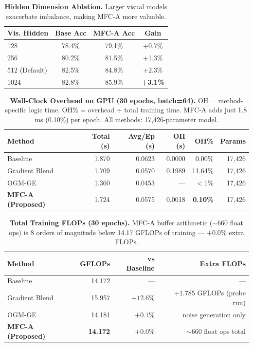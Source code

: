 \documentclass[fleqn,10pt]{wlscirep}
\begin{document}
\begin{table}[h]
\caption{\textbf{Hidden Dimension Ablation.} Larger visual models exacerbate imbalance, making MFC-A more valuable.}
\label{tab:hidden_dim_main}
\centering
\begin{tabular}{@{}lccc@{}}
\toprule
\textbf{Vis. Hidden} & \textbf{Base Acc} & \textbf{MFC-A Acc} & \textbf{Gain} \\ \midrule
128 & 78.4\% & 79.1\% & +0.7\% \\
256 & 80.2\% & 81.5\% & +1.3\% \\
512 (Default) & 82.5\% & 84.8\% & +2.3\% \\
1024 & 82.8\% & 85.9\% & \textbf{+3.1\%} \\ \bottomrule
\end{tabular}
\end{table}

\begin{table}[h]
\caption{\textbf{Wall-Clock Overhead on GPU (30 epochs, batch=64).} OH = method-specific logic time. OH\% = overhead $\div$ total training time. MFC-A adds just 1.8\,ms (0.10\%) per epoch. All methods: 17,426-parameter model.}
\label{tab:timing}
\centering
\begin{tabular}{@{}lrrrrr@{}}
\toprule
\textbf{Method} & \textbf{Total (s)} & \textbf{Avg/Ep (s)} & \textbf{OH (s)} & \textbf{OH\%} & \textbf{Params} \\ \midrule
Baseline               & 1.870 & 0.0623 & 0.0000 & 0.00\%  & 17,426 \\
Gradient Blend         & 1.709 & 0.0570 & 0.1989 & 11.64\% & 17,426 \\
OGM-GE                 & 1.360 & 0.0453 & ---    & $<$1\%  & 17,426 \\
\textbf{MFC-A (Proposed)} & 1.724 & 0.0575 & 0.0018 & \textbf{0.10\%} & 17,426 \\
\bottomrule
\end{tabular}
\end{table}

\begin{table}[h]
\caption{\textbf{Total Training FLOPs (30 epochs).} MFC-A buffer arithmetic ($\sim$660 float ops) is 8 orders of magnitude below 14.17 GFLOPs of training --- $+0.0\%$ extra FLOPs.}
\label{tab:flops}
\centering
\begin{tabular}{@{}lrrr@{}}
\toprule
\textbf{Method} & \textbf{GFLOPs} & \textbf{vs Baseline} & \textbf{Extra FLOPs} \\ \midrule
Baseline               & 14.172 & ---       & --- \\
Gradient Blend         & 15.957 & $+12.6\%$ & $+1.785$ GFLOPs (probe run) \\
OGM-GE                 & 14.181 & $+0.1\%$  & noise generation only \\
\textbf{MFC-A (Proposed)} & \textbf{14.172} & $+0.0\%$ & $\sim$660 float ops total \\
\bottomrule
\end{tabular}
\end{table}
\end{document}
